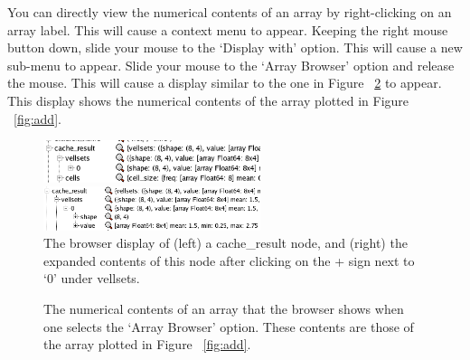 \documentclass[10pt]{article}
\begin{document}
You can directly view the numerical contents of an array by right-clicking
on an array label. This will cause a context menu to appear. Keeping
the right mouse button down, slide your mouse to the `Display with' option.
This will cause a new sub-menu to appear. Slide your mouse to the
`Array Browser' option and release the mouse. This will cause a
display similar to the one in  Figure ~\ref{fig:ArrayBrowser}
to appear. This display shows the numerical contents of the array
plotted in Figure ~\ref{fig:add}.


\begin{figure}
  \centering
  \begin{minipage}[c]{0.5\textwidth}
     \centering \includegraphics[width=2.5in]{Figures/browser_small1}
  \end{minipage}%
  \begin{minipage}[c]{0.5\textwidth}
     \centering \includegraphics[width=2.5in]{Figures/browser_small2}
  \end{minipage}
  \caption {The browser display of (left) a cache\_result node, and 
(right) the expanded contents of this node after clicking on the
+ sign next to `0' under vellsets.}
  \label{fig:ArraySelect}
\end{figure}

\begin{figure}
{\par\centering
{}
\par}
\caption {The numerical contents of an array that the browser shows
when one selects the `Array Browser' option. 
These contents are those of the array plotted in Figure ~\ref{fig:add}.}
\label{fig:ArrayBrowser}
\end{figure}
\end{document}
